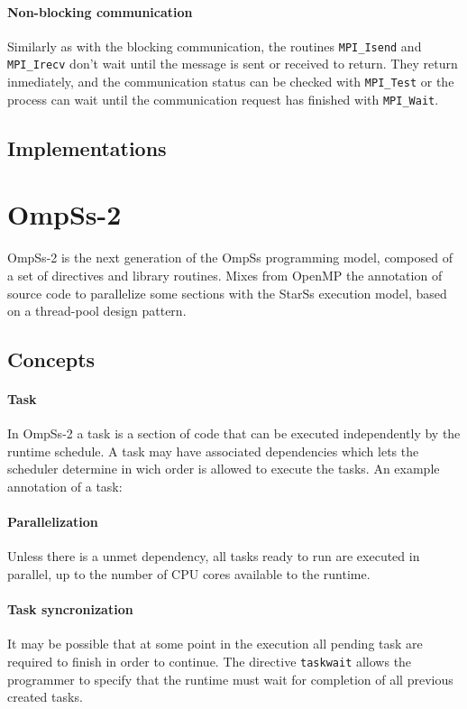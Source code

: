 \paragraph{Non-blocking communication} Similarly as with the blocking
communication, the routines \texttt{MPI\_Isend} and \texttt{MPI\_Irecv} don't
wait until the message is sent or received to return. They return inmediately,
and the communication status can be checked with \texttt{MPI\_Test} or the
process can wait until the communication request has finished with
\texttt{MPI\_Wait}.

\subsection{Implementations}


\section{OmpSs-2}

OmpSs-2 is the next generation of the OmpSs programming model, composed of a set
of directives and library routines. Mixes from OpenMP the annotation of source
code to parallelize some sections with the StarSs execution model, based on a
thread-pool design pattern.

\subsection{Concepts}

\paragraph{Task} In OmpSs-2 a task is a section of code that can be executed
independently by the runtime schedule. A task may have associated dependencies
which lets the scheduler determine in wich order is allowed to execute the
tasks. An example annotation of a task:


\paragraph{Parallelization} Unless there is a unmet dependency, all tasks ready
to run are executed in parallel, up to the number of CPU cores available to the
runtime.

\paragraph{Task syncronization} It may be possible that at some point in the
execution all pending task are required to finish in order to continue. The
directive \texttt{taskwait} allows the programmer to specify that the runtime
must wait for completion of all previous created tasks.
